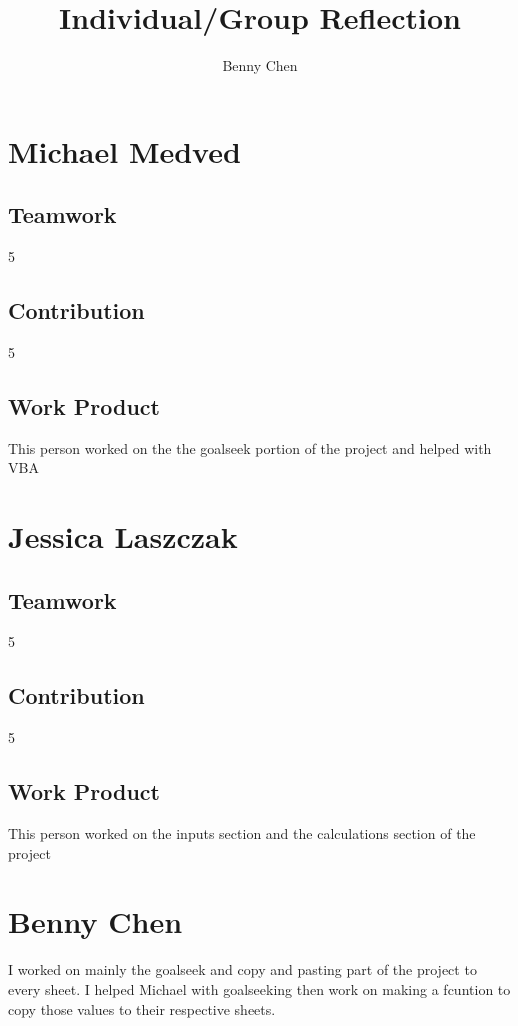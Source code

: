 \documentclass{article}
\title{Individual/Group Reflection}
\author{Benny Chen}
\date{}
\begin{document}
\maketitle

\section*{Michael Medved}
\subsection*{Teamwork}
5
\subsection*{Contribution}
5
\subsection*{Work Product}
This person worked on the the goalseek portion of the project and helped with VBA

\section*{Jessica Laszczak}
\subsection*{Teamwork}
5
\subsection*{Contribution}
5
\subsection*{Work Product}
This person worked on the inputs section and the calculations section of the project

\section*{Benny Chen}
I worked on mainly the goalseek and copy and pasting part of the project to every sheet. I helped Michael with goalseeking then work on making a fcuntion to copy those values to their respective sheets.
\end{document}
